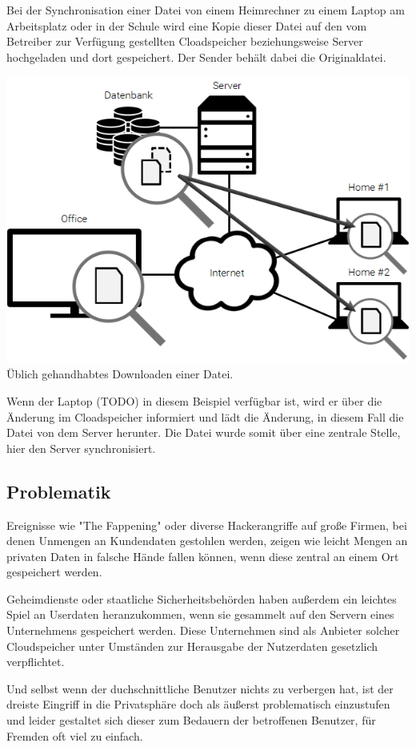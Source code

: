 Bei der Synchronisation einer Datei von einem Heimrechner zu einem Laptop am
Arbeitsplatz oder in der Schule wird eine Kopie dieser Datei auf den vom
Betreiber zur Verfügung gestellten Cloadspeicher beziehungsweise Server
hochgeladen und dort gespeichert. Der Sender behält dabei die Originaldatei.

\includegraphics[]{images/Dropbox_2}
Üblich gehandhabtes Downloaden einer Datei.

Wenn der Laptop (TODO) in diesem Beispiel verfügbar ist, wird er über die Änderung
im Cloadspeicher informiert und lädt die Änderung, in diesem Fall die Datei von
dem Server herunter. Die Datei wurde somit über eine zentrale Stelle, hier den
Server synchronisiert.

\subsection{Problematik}
Ereignisse wie "The Fappening" oder diverse Hackerangriffe auf große Firmen, bei
denen Unmengen an Kundendaten gestohlen werden, zeigen wie leicht Mengen an
privaten Daten in falsche Hände fallen können, wenn diese zentral an einem Ort
gespeichert werden.

Geheimdienste oder staatliche Sicherheitsbehörden haben außerdem ein leichtes
Spiel an Userdaten heranzukommen, wenn sie gesammelt auf den Servern eines
Unternehmens gespeichert werden. Diese Unternehmen sind als Anbieter solcher
Cloudspeicher unter Umständen zur Herausgabe der Nutzerdaten gesetzlich
verpflichtet.

Und selbst wenn der duchschnittliche Benutzer nichts zu verbergen hat, ist der
dreiste Eingriff in die Privatsphäre doch als äußerst problematisch einzustufen
und leider gestaltet sich dieser zum Bedauern der betroffenen Benutzer, für
Fremden oft viel zu einfach.

